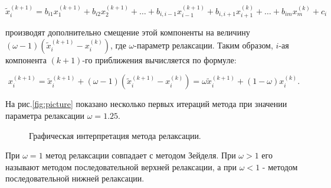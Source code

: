\documentclass[12pt, a4paper]{article}
\begin{document}
\begin{enumerate}
\[
\widetilde x_{i}^{(k+1)}=b_{i1}x_{1}^{(k+1)}+b_{i2}x_{2}^{(k+1)}+ \ldots + b_{i,i-1}x_{i-1}^{(k+1)}+ b_{i,i+1}x_{i+1}^{(k)} + \ldots + b_{im}x_{m}^{(k)}+c_{i} \]

производят дополнительно смещение этой компоненты на величину $(\omega -1)(\widetilde x_{i}^{(k+1)}-x_{i}^{(k)})$, где $\omega$-параметр релаксации. Таким образом, $i$-ая компонента $(k+1)$-го приближения вычисляется по формуле:

\[
x_{i}^{(k+1)}=\widetilde x_{i}^{(k+1)}+(\omega -1)(\widetilde x_{i}^{(k+1)} -x_{i}^{(k)})=\omega\widetilde x_{i}^{(k+1)} + (1-\omega)x_{i}^{(k)}.
\]

На рис.\eqref{fig:picture} показано несколько первых итераций метода при значении параметра релаксации $\omega=1.25$.\\
	
\begin{figure}[H]
\caption{Графическая интерпретация метода релаксации.}
\label{fig:picture}
\end{figure}
	
	
При $\omega = 1$ метод релаксации совпадает с методом Зейделя. При $\omega > 1$ его называют методом последовательной верхней релаксации, а при $\omega < 1$ - методом последовательной нижней релаксации. \\
	

\end{enumerate}
\end{document}

